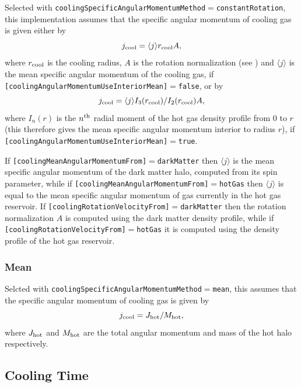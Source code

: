 Selected with {\tt coolingSpecificAngularMomentumMethod}$=${\tt constantRotation}, this implementation assumes that the specific angular momentum of cooling gas is given either by
\begin{equation}
 j_{\rm cool} = \langle j \rangle r_{\rm cool} A,
\end{equation}
where $r_{\rm cool}$ is the cooling radius, $A$ is the rotation normalization (see ) and $\langle j \rangle$ is the mean specific angular momentum of the cooling gas, if {\tt [coolingAngularMomentumUseInteriorMean]}$=${\tt false}, or by
\begin{equation}
 j_{\rm cool} = \langle j \rangle {I_3(r_{\rm cool})/I_2(r_{\rm cool})} A,
\end{equation}
where $I_n(r)$ is the $n^{\rm th}$ radial moment of the hot gas density profile from $0$ to $r$ (this therefore gives the mean specific angular momentum interior to radius $r$), if {\tt [coolingAngularMomentumUseInteriorMean]}$=${\tt true}.

If {\tt [coolingMeanAngularMomentumFrom]}$=${\tt darkMatter} then $\langle j \rangle$ is the mean specific angular momentum of the dark matter halo, computed from its spin parameter, while if {\tt [coolingMeanAngularMomentumFrom]}$=${\tt hotGas} then $\langle j \rangle$ is equal to the mean specific angular momentum of gas currently in the hot gas reservoir. If {\tt [coolingRotationVelocityFrom]}$=${\tt darkMatter} then the rotation normalization $A$ is computed using the dark matter density profile, while if {\tt [coolingRotationVelocityFrom]}$=${\tt hotGas} it is computed using the density profile of the hot gas reservoir.

\subsubsection{Mean}

Selcted with {\tt coolingSpecificAngularMomentumMethod}$=${\tt mean}, this assumes that the specific angular momentum of cooling gas is given by
\begin{equation}
 j_{\rm cool} = J_{\rm hot}/M_{\rm hot},
\end{equation}
where $J_{\rm hot}$ and $M_{\rm hot}$ are the total angular momentum and mass of the hot halo respectively.

\subsection{Cooling Time}\label{sec:CoolingTime}

